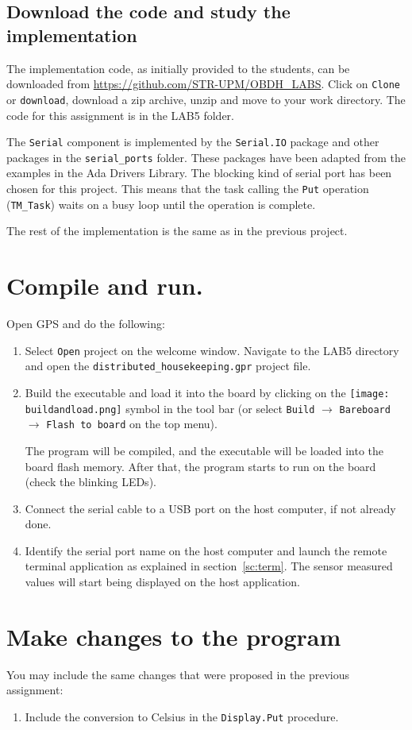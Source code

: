 \subsection{Download the code and study the implementation}

The implementation code, as initially provided to the students, can be downloaded from \url{https://github.com/STR-UPM/OBDH_LABS}. Click on {\tt Clone} or {\tt download}, download a zip archive, unzip and move to your work directory. The code for this assignment is in the LAB5 folder.

The {\tt Serial} component is implemented by the {\tt Serial.IO} package and other packages in the {\tt serial\_ports} folder. These packages have been adapted from the examples in the Ada Drivers Library. The blocking kind of serial port has been chosen for this project. This means that the task calling the {\tt Put} operation ({\tt TM\_Task}) waits on a busy loop until the operation is complete.

The rest of the implementation is the same as in the previous project.

\section{Compile and run.}

Open GPS and do the following:
\begin{enumerate}
\item Select {\tt Open} project on the welcome window. Navigate to the LAB5 directory and open the {\tt distributed\_housekeeping.gpr} project file.
\item Build the executable and load it into the board by clicking on the \hbox{\texttt{[image: buildandload.png]}} symbol in the tool bar (or select {\tt Build} $\rightarrow$ {\tt Bareboard} $\rightarrow$ {\tt Flash to board} on the top menu).

The program will be compiled, and the executable will be loaded into the board flash memory. After that, the program starts to run on the board (check the blinking LEDs).
\item Connect the serial cable to a USB port on the host computer, if not already done.
\item Identify the serial port name on the host computer and launch the remote terminal application as explained in section~\ref{sc:term}. The sensor measured values will start being displayed on the host application.
\end{enumerate}


\section{Make changes to the program}

You may include the same changes that were proposed in the previous assignment:

\begin{enumerate}
\item Include the conversion to Celsius in the {\tt Display.Put} procedure.
\end{enumerate}
